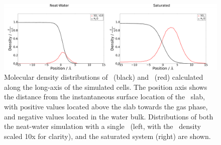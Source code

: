 \begin{figure}[h!]
	\begin{center}
		\includegraphics[scale=1.0]{images/density/density.png}
		\caption{Molecular density distributions of \wat~(black) and \suldiox~(red) calculated along the long-axis of the simulated cells. The position axis shows the distance from the instantaneous surface location of the \wat~slab, with positive values located above the slab towards the gas phase, and negative values located in the water bulk. Distributions of both the neat-water simulation with a single \suldiox~(left, with the \suldiox~density scaled 10x for clarity), and the saturated system (right) are shown.}
		\label{fig:density}
	\end{center}
\end{figure}
